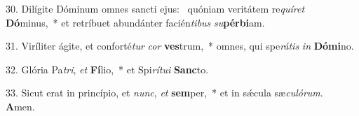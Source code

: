 30. Dilígite Dóminum omnes sancti ejus: \dag\  quóniam veritátem re\textit{quí}\textit{ret} \textbf{Dó}minus,~*  et retríbuet abundánter facién\textit{ti}\textit{bus} \textit{su}\textbf{pér}\textbf{bi}am.\

31. Viríliter ágite, et conforté\textit{tur} \textit{cor} \textbf{ves}trum,~*  omnes, qui spe\textit{rá}\textit{tis} \textit{in} \textbf{Dó}\textbf{mi}no.\

32. Glória Pa\textit{tri}, \textit{et} \textbf{Fí}lio,~*  et Spi\textit{rí}\textit{tu}\textit{i} \textbf{Sanc}to.\

33. Sicut erat in princípio, et \textit{nunc}, \textit{et} \textbf{sem}per,~*  et in sǽcula sæ\textit{cu}\textit{ló}\textit{rum}. \textbf{A}men.\

